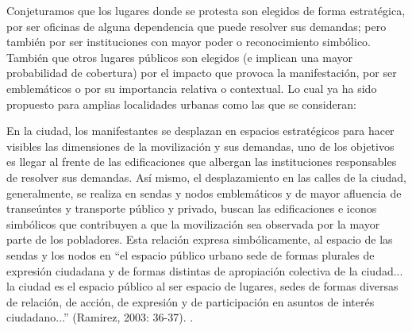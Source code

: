 \documentclass[letterpaper, 11pt]{book}
\theoremstyle{definition}
\theoremstyle{remark}
\begin{document}
Conjeturamos que los lugares donde se protesta son elegidos de forma estratégica, por ser oficinas de alguna dependencia que puede resolver sus demandas; pero también por ser instituciones con mayor poder o reconocimiento simbólico. 
También que otros lugares públicos son elegidos (e implican una mayor probabilidad de cobertura) por el impacto que provoca la manifestación, por ser emblemáticos o por su importancia relativa o contextual. 
Lo cual ya ha sido propuesto para amplias localidades urbanas como las que se consideran: 
\begin{center}
    \begin{minipage}{0.9\linewidth}
        {\setlength{\parindent}{12pt}\small
	     En la ciudad, los manifestantes se desplazan en espacios estratégicos para hacer visibles las dimensiones de la movilización y sus demandas, uno de los objetivos es llegar al frente de las edificaciones que albergan las instituciones responsables de resolver sus demandas. 
	     Así mismo, el desplazamiento en las calles de la ciudad, generalmente, se realiza en sendas y nodos emblemáticos y de mayor afluencia de transeúntes y transporte público y privado, buscan las edificaciones e iconos simbólicos que contribuyen a que la movilización sea observada por la mayor parte de los pobladores. 
	     Esta relación expresa simbólicamente, al espacio de las sendas y los nodos en ``el espacio público urbano sede de formas plurales de expresión ciudadana y de formas distintas de apropiación colectiva de la ciudad... la ciudad es el espacio público al ser espacio de lugares, sedes de formas diversas de relación, de acción, de expresión y de participación en asuntos de interés ciudadano...'' (Ramirez, 2003: 36-37).  \normalsize \citep[247--248]{2015_Nicolasa_MassMedia}.
        }
    \end{minipage}
\end{center}



\end{document}
